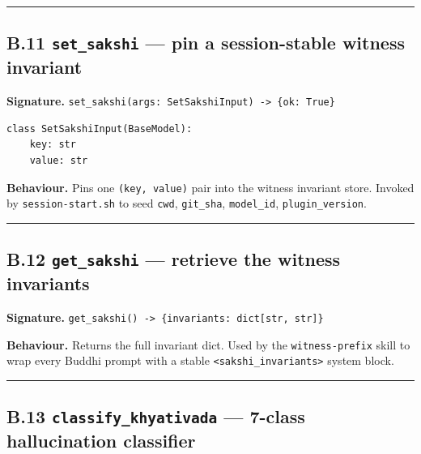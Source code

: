 \begin{center}\rule{0.5\linewidth}{0.5pt}\end{center}

\subsection{\texorpdfstring{B.11 \texttt{set\_sakshi} --- pin a session-stable witness invariant}{B.11 set\_sakshi --- pin a session-stable witness invariant}}\label{b.11-set_sakshi-pin-a-session-stable-witness-invariant}

\textbf{Signature.} \texttt{set\_sakshi(args:\ SetSakshiInput)\ -\textgreater{}\ \{ok:\ True\}}

\begin{verbatim}
class SetSakshiInput(BaseModel):
    key: str
    value: str
\end{verbatim}

\textbf{Behaviour.} Pins one \texttt{(key,\ value)} pair into the witness invariant store. Invoked by \texttt{session-start.sh} to seed \texttt{cwd}, \texttt{git\_sha}, \texttt{model\_id}, \texttt{plugin\_version}.

\begin{center}\rule{0.5\linewidth}{0.5pt}\end{center}

\subsection{\texorpdfstring{B.12 \texttt{get\_sakshi} --- retrieve the witness invariants}{B.12 get\_sakshi --- retrieve the witness invariants}}\label{b.12-get_sakshi-retrieve-the-witness-invariants}

\textbf{Signature.} \texttt{get\_sakshi()\ -\textgreater{}\ \{invariants:\ dict{[}str,\ str{]}\}}

\textbf{Behaviour.} Returns the full invariant dict. Used by the \texttt{witness-prefix} skill to wrap every Buddhi prompt with a stable \texttt{\textless{}sakshi\_invariants\textgreater{}} system block.

\begin{center}\rule{0.5\linewidth}{0.5pt}\end{center}

\subsection{\texorpdfstring{B.13 \texttt{classify\_khyativada} --- 7-class hallucination classifier}{B.13 classify\_khyativada --- 7-class hallucination classifier}}\label{b.13-classify_khyativada-7-class-hallucination-classifier}

